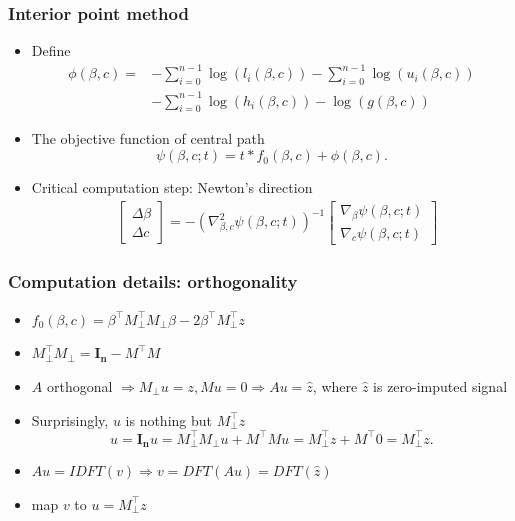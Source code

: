 \documentclass{beamer}
\begin{document}
\begin{frame}
\frametitle{Interior point method}
\begin{itemize}
\item Define
\begin{equation}
\begin{aligned}
    \phi(\beta, c) = &-\sum_{i=0}^{n-1} \log (l_i(\beta, c)) - \sum_{i=0}^{n-1} \log (u_i(\beta, c))\\
    &- \sum_{i=0}^{n-1}\log (h_i(\beta, c)) -\log (g(\beta, c))   
\end{aligned}
\end{equation}
\item The objective function of central path
\begin{equation}
   \psi(\beta, c; t)= t*f_0(\beta,c)+\phi(\beta,c).
\end{equation}
\item Critical computation step: Newton's direction
    \begin{equation}\label{DeltaNTdef}
    \begin{aligned}
    &\begin{bmatrix}
    \Delta \beta\\
    \Delta c
    \end{bmatrix} = -(\nabla^2_{\beta,c} \psi(\beta,c;t))^{-1}
    \begin{bmatrix}
    \nabla_{\beta}\psi(\beta,c;t)\\
    \nabla_c\psi(\beta,c;t)
    \end{bmatrix}
    \end{aligned}
\end{equation}
\end{itemize}
\end{frame}

\begin{frame}
\frametitle{Computation details: orthogonality}
\begin{itemize}
\item $f_0(\beta, c) = \beta^\top M_{\perp}^\top M_{\perp}\beta-2\beta^\top M_{\perp}^\top z$
\item $M_{\perp}^{\top}M_{\perp} = \mathbf{I_n}-M^{\top}M $
\item $A$ orthogonal $\Rightarrow M_{\perp}u = z, Mu = 0 \Rightarrow Au = \widehat{z}$, where $\widehat{z}$ is zero-imputed signal\\
\item Surprisingly, $u$ is nothing but $M_{\perp}^{\top}z$
\begin{equation}
    u = \mathbf{I_n}u = M_{\perp}^{\top} M_{\perp}u +  M^{\top}Mu = M_{\perp}^{\top}z + M^{\top}0 = M_{\perp}^{\top}z.
\end{equation}
\item $Au = IDFT(v) \Rightarrow v = DFT(Au) = DFT(\widehat{z})$
\item map $v$ to $u=M_{\perp}^{\top}z$
\end{itemize}
\end{frame}
\end{document}
